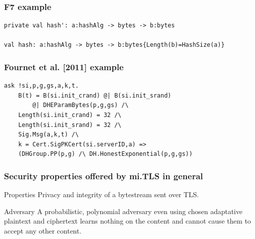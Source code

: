 \documentclass{beamer}
\begin{document}
\begin{frame}[fragile]
    \frametitle{F7 example}

    \begin{lstlisting}
private val hash': a:hashAlg -> bytes -> b:bytes

val hash: a:hashAlg -> bytes -> b:bytes{Length(b)=HashSize(a)}
    \end{lstlisting}
\end{frame}

\begin{frame}[fragile]
    \frametitle{Fournet et al. [2011] example}

    \begin{lstlisting}
ask !si,p,g,gs,a,k,t.
    B(t) = B(si.init_crand) @| B(si.init_srand)
        @| DHEParamBytes(p,g,gs) /\
    Length(si.init_crand) = 32 /\
    Length(si.init_srand) = 32 /\
    Sig.Msg(a,k,t) /\
    k = Cert.SigPKCert(si.serverID,a) =>
    (DHGroup.PP(p,g) /\ DH.HonestExponential(p,g,gs))
    \end{lstlisting}
\end{frame}

\begin{frame}
    \frametitle{Security properties offered by mi.TLS in general}

    \begin{block}{Properties}
        Privacy and integrity of a bytestream sent over TLS.
    \end{block}
    \vfill
    \begin{block}{Adversary}
        A probabilistic, polynomial adversary even using chosen adaptative plaintext and ciphertext learns nothing on the content  and cannot cause them to accept any other content.
    \end{block}
\end{frame}
\end{document}
